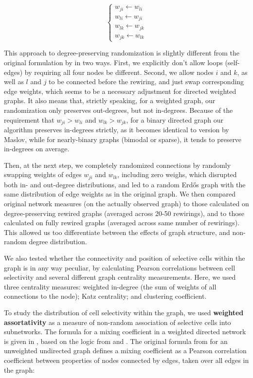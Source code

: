 \documentclass{article}
\begin{document}
\[ \left \{ \begin{array}{l}  
w_{ji} \leftarrow w_{li} \\ 
w_{li} \leftarrow w_{ji} \\
w_{lk} \leftarrow w_{jk} \\
w_{jk} \leftarrow w_{lk}
\end{array} \right. \]

This approach to degree-preserving randomization is slightly different from the original formulation by \citep{maslov2002} in two ways. First, we explicitly don’t allow loops (self-edges) by requiring all four nodes be different. Second, we allow nodes $i$ and $k$, as well as $l$ and $j$ to be connected before the rewiring, and just swap corresponding edge weights, which seems to be a necessary adjustment for directed weighted graphs. It also means that, strictly speaking, for a weighted graph, our randomization only preserves out-degrees, but not in-degrees. Because of the requirement that $w_{ji}>w_{li}$ and $w_{lk}>w_{jk}$, for a binary directed graph our algorithm preserves in-degrees strictly, as it becomes identical to version by Maslov, while for nearly-binary graphs (bimodal or sparse), it tends to preserve in-degrees on average.

Then, at the next step, we completely randomized connections by randomly swapping weights of edges $w_{ji}$ and $w_{lk}$, including zero weighs, which disrupted both in- and out-degree distributions, and led to a random Erd\H{o}s graph with the same distribution of edge weights as in the original graph. We then compared original network measures (on the actually observed graph) to those calculated on degree-preserving rewired graphs (averaged across 20-50 rewirings), and to those calculated on fully rewired graphs (averaged across same number of rewirings). This allowed us too differentiate between the effects of graph structure, and non-random degree distribution.

We also tested whether the connectivity and position of selective cells within the graph is in any way peculiar, by calculating Pearson correlations between cell selectivity and several different graph centrality measurements. Here, we used three centrality measures: weighted in-degree (the sum of weights of all connections to the node); Katz centrality; and clustering coefficient.

To study the distribution of cell selectivity within the graph, we used \textbf{weighted assortativity} as a measure of non-random association of selective cells into subnetworks. The formula for a mixing coefficient in a weighted directed network is given in \citep{farine2014weighted}, based on the logic from \citep{newman2003mixing} and \citep{leung2007weighted}. The original formula from \citep{newman2003mixing} for an unweighted undirected graph defines a mixing coefficient as a Pearson correlation coefficient between properties of nodes connected by edges, taken over all edges in the graph:
\end{document}
